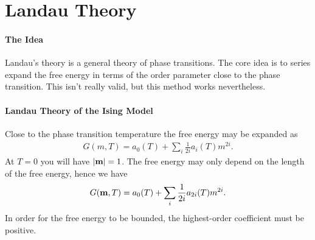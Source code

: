 \section{Landau Theory}

\paragraph{The Idea}
Landau's theory is a general theory of phase transitions. The core idea is to series expand the free energy in terms of the order parameter close to the phase transition. This isn't really valid, but this method works nevertheless.

\paragraph{Landau Theory of the Ising Model}
Close to the phase transition temperature the free energy may be expanded as
\begin{align*}
	G(m, T) = a_{0}(T) + \sum\limits_{i}\frac{1}{2i}a_{i}(T)m^{2i}.
\end{align*}
At $T = 0$ you will have $\abs{\vb{m}} = 1$. The free energy may only depend on the length of the free energy, hence we have
\begin{align*}
	G(\vb{m}, T) = a_{0}(T) + \sum\limits_{i}\frac{1}{2i}a_{2i}(T)m^{2i}.
\end{align*}
In order for the free energy to be bounded, the highest-order coefficient must be positive.

